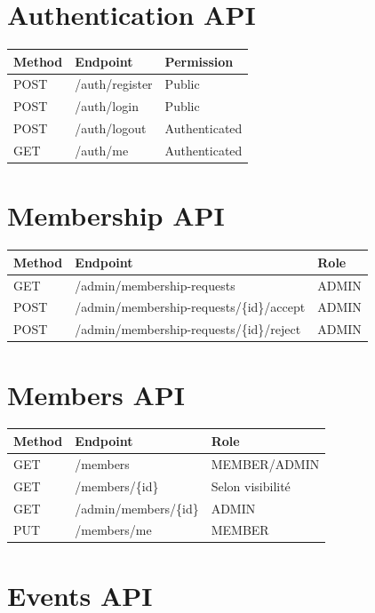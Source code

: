 \documentclass[11pt,a4paper]{report}
\begin{document}
\section{Authentication API}

\begin{longtable}{p{}p{}p{}}
\toprule
\textbf{Method} & \textbf{Endpoint} & \textbf{Permission}\\
\midrule
POST & /auth/register & Public\\
POST & /auth/login & Public\\
POST & /auth/logout & Authenticated\\
GET & /auth/me & Authenticated\\
\bottomrule
\end{longtable}

\section{Membership API}

\begin{longtable}{p{}p{}p{}}
\toprule
\textbf{Method} & \textbf{Endpoint} & \textbf{Role}\\
\midrule
GET & /admin/membership-requests & ADMIN\\
POST & /admin/membership-requests/\{id\}/accept & ADMIN\\
POST & /admin/membership-requests/\{id\}/reject & ADMIN\\
\bottomrule
\end{longtable}

\section{Members API}

\begin{longtable}{p{}p{}p{}}
\toprule
\textbf{Method} & \textbf{Endpoint} & \textbf{Role}\\
\midrule
GET & /members & MEMBER/ADMIN\\
GET & /members/\{id\} & Selon visibilité\\
GET & /admin/members/\{id\} & ADMIN\\
PUT & /members/me & MEMBER\\
\bottomrule
\end{longtable}

\section{Events API}
\end{document}
